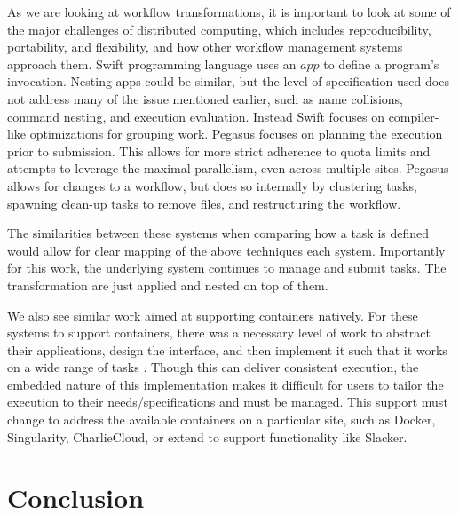 \documentclass[conference]{IEEEtran}
\begin{document}
As we are looking at workflow 
transformations, it is important to look
at some of the major challenges of distributed
computing\cite{4404805},
which includes reproducibility, 
portability,
and flexibility, and 
how other workflow management systems
approach them.
Swift\cite{swift} programming language 
uses an $app$ to define a program's invocation.
Nesting apps could be similar, 
but the level of
specification used does
not address many of the
issue mentioned earlier, such
as name collisions, command
nesting, and execution evaluation.
Instead Swift focuses on compiler-like
optimizations for grouping work\cite{Armstrong:2014:CTM:2683593.2683627}.
Pegasus\cite{pegasus} focuses on planning the
execution prior to submission.
This allows for more strict
adherence to quota limits and attempts
to leverage the maximal parallelism,
even across multiple sites\cite{chen2011constraints}.
Pegasus allows for changes to a
workflow, but does so internally by clustering
tasks\cite{chen2013balanced, chen-tcc-2015, chen-fgcs-2014}, spawning clean-up
tasks to remove files\cite{cleanup_algo}, and 
restructuring the workflow\cite{cluster_dep}.

The similarities between these systems when comparing how
a task is defined would allow for clear mapping of
the above techniques each system.
Importantly for this work, the underlying system continues
to manage and submit tasks. 
The transformation are 
just applied and nested on top of them.

We also see similar work aimed at 
supporting containers natively.
For these systems to support containers,
there was a necessary level of work to abstract their applications,
design the interface, and then implement it
such that it works on a wide range of tasks
\cite{wq-docker-vtdc15, containers-sciencecloud-2018,7092947,7600178}.
Though this can deliver consistent execution,
the embedded nature of this implementation makes
it difficult for users to tailor the execution
to their needs/specifications and must be
managed.
This support must change to address
the available containers on a particular site,
such as 
Docker\cite{Merkel:2014:DLL:2600239.2600241},
Singularity\cite{Singularity}, 
CharlieCloud\cite{Priedhorsky:2017:CUC:3126908.3126925},
or extend to support functionality like Slacker\cite{194430}.


\section{Conclusion}
\end{document}
